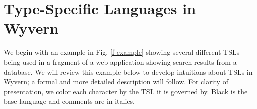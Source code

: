 \section{Type-Specific Languages in Wyvern}
\label{s:motivation}
We begin with an example in Fig. \ref{f-example} showing several different TSLs being used in a fragment of a web application showing search results from a database. We will review this example below to develop intuitions about TSLs in Wyvern; a formal and more detailed description will follow. For clarity of presentation, we color each character by the TSL it is governed by. Black is the base language and comments are in italics.

